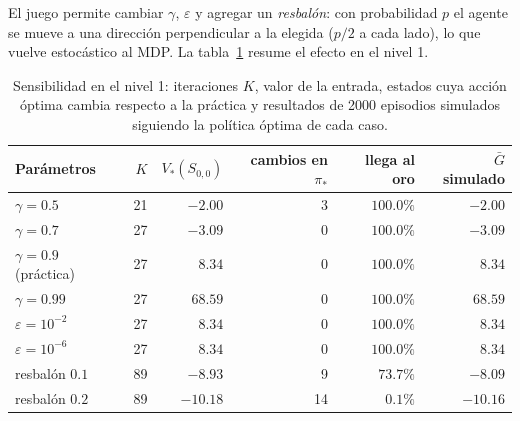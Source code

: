 \documentclass[11pt,letterpaper]{article}
\begin{document}
El juego permite cambiar $\gamma$, $\varepsilon$ y agregar un \emph{resbalón}: con probabilidad $p$ el agente se mueve a una dirección perpendicular a la elegida ($p/2$ a cada lado), lo que vuelve estocástico al MDP. La tabla~\ref{tab:sensibilidad} resume el efecto en el nivel 1.

\begin{table}[H]
\centering
\small
\caption{Sensibilidad en el nivel 1: iteraciones $K$, valor de la entrada, estados cuya acción óptima cambia respecto a la práctica y resultados de 2000 episodios simulados siguiendo la política óptima de cada caso.}
\label{tab:sensibilidad}
\begin{tabular}{lrrrrr}
\toprule
Parámetros & $K$ & $V_*(S_{0,0})$ & cambios en $\pi_*$ & llega al oro & $\bar G$ simulado \\
\midrule
$\gamma = 0.5$ & 21 & $-2.00$ & 3 & $100.0\%$ & $-2.00$ \\
$\gamma = 0.7$ & 27 & $-3.09$ & 0 & $100.0\%$ & $-3.09$ \\
$\gamma = 0.9$ (práctica) & 27 & $8.34$ & 0 & $100.0\%$ & $8.34$ \\
$\gamma = 0.99$ & 27 & $68.59$ & 0 & $100.0\%$ & $68.59$ \\
$\varepsilon = 10^{-2}$ & 27 & $8.34$ & 0 & $100.0\%$ & $8.34$ \\
$\varepsilon = 10^{-6}$ & 27 & $8.34$ & 0 & $100.0\%$ & $8.34$ \\
resbalón $0.1$ & 89 & $-8.93$ & 9 & $73.7\%$ & $-8.09$ \\
resbalón $0.2$ & 89 & $-10.18$ & 14 & $0.1\%$ & $-10.16$ \\
\bottomrule
\end{tabular}
\end{table}
\end{document}
